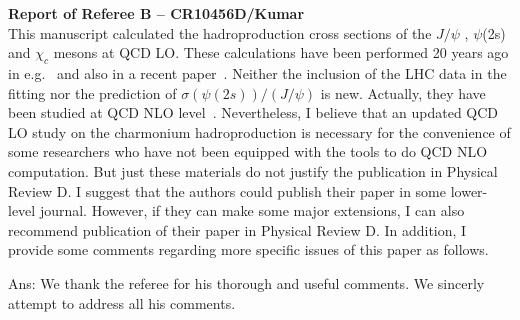 \documentclass[aps,prc,preprint,superscriptaddress,showpacs,showkeys,amsmath]{revtex4-1}
\begin{document}
{\bf Report of Referee B -- CR10456D/Kumar} \\

This manuscript calculated the hadroproduction cross sections of the 
$J/\psi$ ,  $\psi$(2s) and $\chi_c$ mesons at QCD LO. These calculations have been 
performed 20 years ago in e.g.~\cite{Cho:1995vh,Beneke:1996yw,Leibovich:1996pa,Braaten:1999qk} 
and also in a recent paper~\cite{Sharma:2012dy}. Neither the inclusion of the LHC data in the 
fitting nor the prediction of $\sigma(\psi(2s))/(J/\psi)$ is new.  Actually, they have 
been studied at QCD NLO level~\cite{Shao:2014yta,Sun:2015pia}. Nevertheless, I believe 
that an updated QCD LO study on the charmonium
hadroproduction is necessary for the convenience of some researchers who have not been
equipped with the tools to do QCD NLO computation. But just these materials do not
justify the publication in Physical Review D. I suggest that the authors could publish 
their paper in some lower-level journal. However, if they can make some major 
extensions, I can also recommend publication of their paper in Physical Review D.
 In addition, I provide some comments regarding more specific issues of this paper 
as follows.

Ans: We thank the referee for his thorough and useful comments. We sincerly attempt
to address all his comments.

\end{document}
